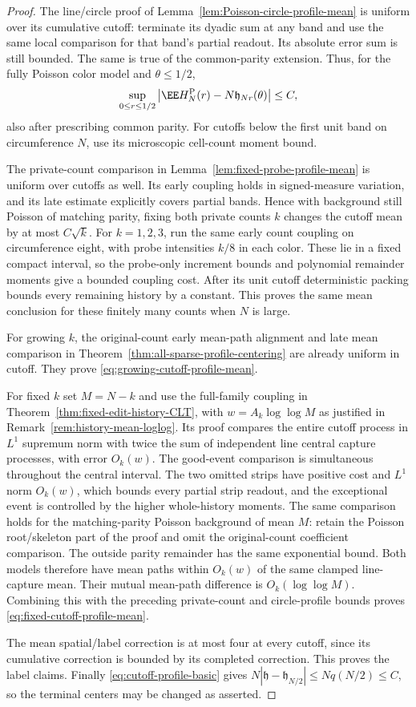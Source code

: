 \documentclass[11pt,letterpaper]{article}
\begin{document}
\begin{proof}
The line/circle proof of
Lemma~\ref{lem:Poisson-circle-profile-mean} is uniform
over its cumulative cutoff: terminate its dyadic sum at
any band and use the same local comparison for that
band's partial readout. Its absolute error sum is still
bounded. The same is true of the common-parity extension.
Thus, for the fully Poisson color model and $\theta\le1/2$,
\[
 \sup_{0\le r\le1/2}
  \left|\EE H_N^{\rm P}(r)-N\mathfrak h_{Nr}(\theta)\right|
                                                        \le C,
\]
also after prescribing common parity.
For cutoffs below the first unit band on circumference
$N$, use its microscopic cell-count moment bound.

The private-count comparison in
Lemma~\ref{lem:fixed-probe-profile-mean} is uniform over
cutoffs as well. Its early coupling holds in signed-measure
variation, and its late estimate explicitly covers
partial bands. Hence with background still Poisson of
matching parity, fixing both private counts $k$ changes
the cutoff mean by at most $C\sqrt k$.
For $k=1,2,3$, run the same early count coupling on
circumference eight, with probe intensities $k/8$ in each
color. These lie in a fixed compact interval, so the
probe-only increment bounds and polynomial remainder
moments give a bounded coupling cost.
After its unit cutoff deterministic packing bounds every
remaining history by a constant.
This proves the same mean conclusion for these finitely
many counts when $N$ is large.

For growing $k$, the original-count early mean-path
alignment and late mean comparison in
Theorem~\ref{thm:all-sparse-profile-centering} are already
uniform in cutoff. They prove
\eqref{eq:growing-cutoff-profile-mean}.

For fixed $k$ set $M=N-k$ and use the full-family coupling
in Theorem~\ref{thm:fixed-edit-history-CLT}, with
$w=A_k\log\log M$ as justified in
Remark~\ref{rem:history-mean-loglog}.
Its proof compares the entire cutoff process in
$L^1$ supremum norm with twice the sum of independent
line central capture processes, with error $O_k(w)$.
The good-event comparison is simultaneous throughout the
central interval. The two omitted strips have positive
cost and $L^1$ norm $O_k(w)$, which bounds every partial
strip readout, and the exceptional event is controlled
by the higher whole-history moments.
The same comparison holds for the matching-parity Poisson
background of mean $M$: retain the Poisson root/skeleton
part of the proof and omit the original-count coefficient
comparison. The outside parity remainder has the same
exponential bound. Both models therefore have mean paths
within $O_k(w)$ of the same clamped line-capture mean.
Their mutual mean-path difference is $O_k(\log\log M)$.
Combining this with the preceding private-count and
circle-profile bounds proves
\eqref{eq:fixed-cutoff-profile-mean}.

The mean spatial/label correction is at most four at
every cutoff, since its cumulative correction is bounded
by its completed correction. This proves the label claims.
Finally \eqref{eq:cutoff-profile-basic} gives
$N|\mathfrak h-\mathfrak h_{N/2}|\le Nq(N/2)\le C$,
so the terminal centers may be changed as asserted.
\end{proof}
\end{document}
